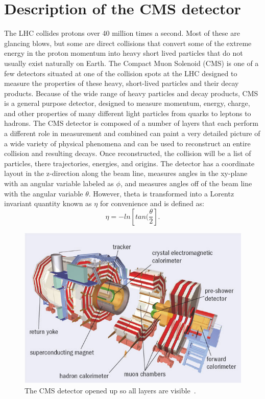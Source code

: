 	\section{Description of the CMS detector}        
		The LHC collides protons over 40 million times a second. Most of these are glancing blows, but some are direct collisions that convert some of the extreme energy in the proton momentum into heavy short lived particles that do not usually exist naturally on Earth. The Compact Muon Solenoid (CMS) is one of a few detectors situated at one of the collision spots at the LHC designed to measure the properties of these heavy, short-lived particles and their decay products. Because of the wide range of heavy particles and decay products, CMS is a general purpose detector, designed to measure momentum, energy, charge, and other properties of many different light particles from quarks to leptons to hadrons. The CMS detector is composed of a number of layers that each perform a different role in measurement and combined can paint a very detailed picture of a wide variety of physical phenomena and can be used to reconstruct an entire collision and resulting decays. Once reconstructed, the collision will be a list of particles, there trajectories, energies, and origins. The detector has a coordinate layout in the z-direction along the beam line, measures angles in the xy-plane with an angular variable labeled as $\phi$, and measures angles off of the beam line with the angular variable $\theta$. However, theta is transformed into a Lorentz invariant quantity known as $\eta$ for convenience and is defined as:
\begin{equation}
\eta = -ln [ tan(\frac{\theta}{2} ].
\end{equation}
		
\begin{figure}[h]
\begin{center}
\includegraphics[width=0.8\linewidth]{Figs/cms_detector_internal_clear.jpg}
\caption{\label{fig:cms_internal}
The CMS detector opened up so all layers are visible~\cite{cmspic}.
}
\end{center}
\end{figure} 

